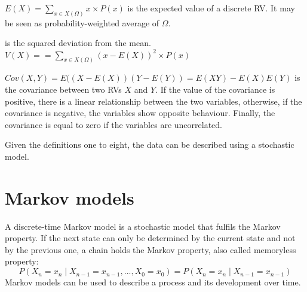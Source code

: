 \begin{definition}[Expectation]
$E(X) = \sum_{x \in X(\Omega)}{x \times P(x)}$ is the expected value of a discrete \ac{RV}. It may be seen as probability-weighted average of $\Omega$\cite{Probability}.
\end{definition}
\begin{definition}[Variance]
is the squared deviation from the mean. $V(X) = = \sum_{x \in X(\Omega)}{(x-E(X))^2 \times P(x)}$\cite{Probability}
\end{definition}
\begin{definition}[Covariance]
$Cov(X,Y) = E((X-E(X))(Y-E(Y)) = E(XY)-E(X)E(Y)$ is the covariance between two \acp{RV} $X$ and $Y$. If the value of the covariance is positive, there is a linear relationship between the two variables, otherwise, if the covariance is negative, the variables show opposite behaviour. Finally, the covariance is equal to zero if the variables are uncorrelated\cite{ProbDistri}.
\end{definition}
Given the definitions one to eight, the data can be described using a stochastic model.\\

\section{Markov models} 
\label{section:MM}
A discrete-time Markov model is a stochastic model that fulfils the Markov property. If the next state can only be determined by the current state and not by the previous one, a chain holds the Markov property, also called memoryless property\cite{Probability}:
\begin{equation}
P(X_n = x_n \mid X_{n-1} = x_{n-1}, ..., X_0 = x_0) = P(X_n = x_n \mid X_{n-1} = x_{n-1})
\end{equation}
Markov models can be used to describe a process and its development over time.\\

